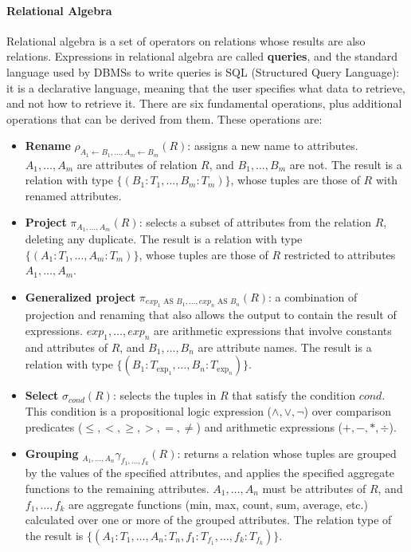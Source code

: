 \paragraph{Relational Algebra} Relational algebra is a set of operators on relations whose results are also relations. Expressions in relational algebra are called \textbf{queries}, and the standard language used by DBMSs to write queries is SQL (Structured Query Language): it is a declarative language, meaning that the user specifies what data to retrieve, and not how to retrieve it. There are six fundamental operations, plus additional operations that can be derived from them. These operations are:
\begin{itemize}
    \item \textbf{Rename} $\rho_{A_1 \leftarrow B_1, \ldots, A_m \leftarrow B_m} (R)$: assigns a new name to attributes. $A_1, \ldots, A_m$ are attributes of relation $R$, and $B_1, \ldots, B_m$ are not. The result is a relation with type $\{(B_1:T_1, \ldots, B_m:T_m)\}$, whose tuples are those of $R$ with renamed attributes.
    \item \textbf{Project} $\pi_{A_1, \ldots, A_m} (R)$: selects a subset of attributes from the relation $R$, deleting any duplicate. The result is a relation with type $\{(A_1:T_1, \ldots, A_m:T_m)\}$, whose tuples are those of $R$ restricted to attributes $A_1, \ldots, A_m$.
    \item \textbf{Generalized project} $\pi_{\textit{exp}_1 \text{ AS }B_1, \ldots, \textit{exp}_n \text{ AS }B_n} (R)$: a combination of projection and renaming that also allows the output to contain the result of expressions. $\textit{exp}_1,\ldots,\textit{exp}_n$ are arithmetic expressions that involve constants and attributes of $R$, and $B_1, \ldots, B_n$ are attribute names. The result is a relation with type $\{(B_1:T_{\text{exp}_1}, \ldots, B_n:T_{\text{exp}_n})\}$.
    \item \textbf{Select} $\sigma_{\textit{cond}} (R)$: selects the tuples in $R$ that satisfy the condition $\textit{cond}$. This condition is a propositional logic expression ($\land, \lor, \lnot$) over comparison predicates ($\leq, <, \geq, >, =, \not =$) and arithmetic expressions ($+,-,*,\div$).
    \item \textbf{Grouping} $_{A_1, \ldots, A_n} \gamma_{f_1, \ldots, f_k} (R)$: returns a relation whose tuples are grouped by the values of the specified attributes, and applies the specified aggregate functions to the remaining attributes. $A_1, \ldots, A_n$ must be attributes of $R$, and $f_1, \ldots, f_k$ are aggregate functions (min, max, count, sum, average, etc.) calculated over one or more of the grouped attributes. The relation type of the result is $\{(A_1:T_1, \ldots, A_n:T_n, f_1:T_{f_1}, \ldots, f_k:T_{f_k})\}$.

\end{itemize}
